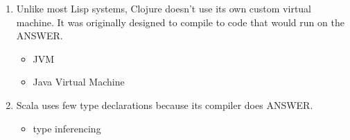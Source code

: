 \documentclass{exam}
\begin{document}
\begin{enumerate}
\begin{itemize}
\end{itemize}
\item Unlike most Lisp systems, Clojure doesn't use its own custom virtual machine.  It was originally designed to compile to code that would run on the ANSWER.
\begin{itemize}
\item JVM
\item Java Virtual Machine
\end{itemize}
\item Scala uses few type declarations because its compiler does ANSWER.
\begin{itemize}
\item type inferencing
\end{itemize}
\end{enumerate}
\end{document}
